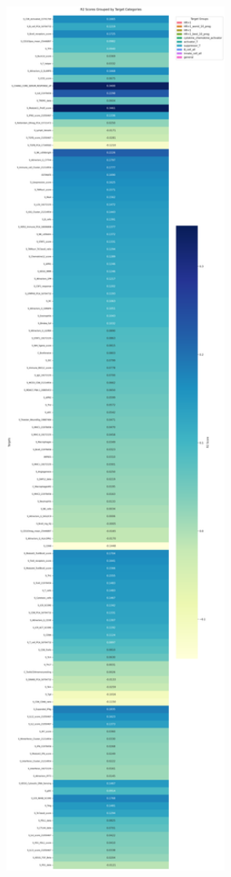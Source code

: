 \documentclass[
  letterpaper,
  DIV=11,
  numbers=noendperiod]{scrartcl}
\begin{document}
\includegraphics[width=12.58333in,height=49.90625in]{xgboost_tuned_files/figure-pdf/cell-46-output-2.png}
\end{document}
